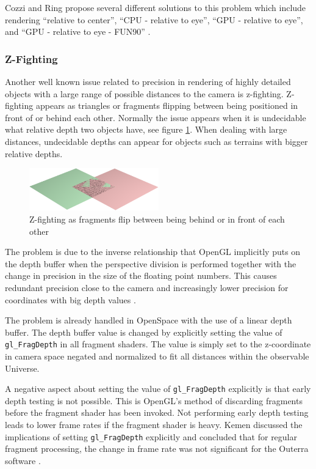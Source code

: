Cozzi and Ring propose several different solutions to this problem which include rendering ``relative to center'', ``CPU - relative to eye'', ``GPU - relative to eye'', and ``GPU - relative to eye - FUN90'' \cite{cozzi11}. 

\subsubsection{Z-Fighting}

Another well known issue related to precision in rendering of highly detailed objects with a large range of possible distances to the camera is z-fighting. Z-fighting appears as triangles or fragments flipping between being positioned in front of or behind each other. Normally the issue appears when it is undecidable what relative depth two objects have, see figure \ref{fig:zfighting}. When dealing with large distances, undecidable depths can appear for objects such as terrains with bigger relative depths.

\begin{figure}[htbp]
    \centering
    \includegraphics[width=0.5\textwidth]{figures/zfighting.png}
    \caption{Z-fighting as fragments flip between being behind or in front of each other}
    \label{fig:zfighting}
\end{figure}

The problem is due to the inverse relationship that OpenGL implicitly puts on the depth buffer when the perspective division is performed together with the change in precision in the size of the floating point numbers. This causes redundant precision close to the camera and increasingly lower precision for coordinates with big depth values \cite{cozzi11}.

The problem is already handled in OpenSpace with the use of a linear depth buffer. The depth buffer value is changed by explicitly setting the value of \texttt{gl\_FragDepth} in all fragment shaders. The value is simply set to the z-coordinate in camera space negated and normalized to fit all distances within the observable Universe.

A negative aspect about setting the value of \texttt{gl\_FragDepth} explicitly is that early depth testing is not possible. This is OpenGL's method of discarding fragments before the fragment shader has been invoked. Not performing early depth testing leads to lower frame rates if the fragment shader is heavy. Kemen discussed the implications of setting \texttt{gl\_FragDepth} explicitly and concluded that for regular fragment processing, the change in frame rate was not significant for the Outerra software \cite{kemen12}.

